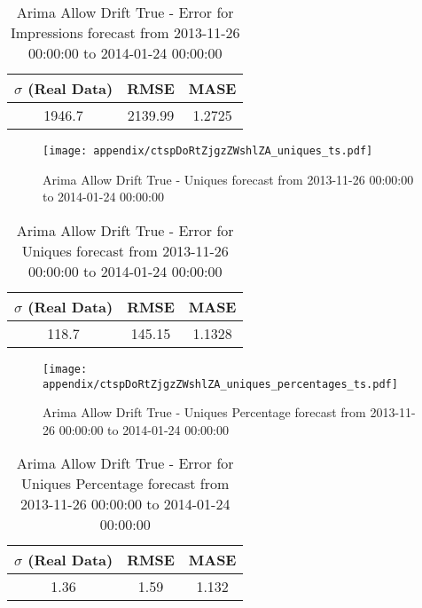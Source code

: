 \begin{table}[H]
\centering
\footnotesize
\begin{tabular}{ccc}
$\sigma$ (Real Data) & RMSE & MASE   \\ \hline
1946.7 & 2139.99 & 1.2725 \\
\end{tabular}

\vspace{0.5cm}

\caption{
Arima Allow Drift True - Error for Impressions forecast from 2013-11-26 00:00:00 to 2014-01-24 00:00:00}
\end{table}

\begin{figure}[H] \begin{center} \leavevmode
\texttt{[image: appendix/ctspDoRtZjgzZWshlZA\_uniques\_ts.pdf]} \caption{
Arima Allow Drift True - Uniques forecast from 2013-11-26 00:00:00 to 2014-01-24 00:00:00} \label{fig:appendix/ctspDoRtZjgzZWshlZA_uniques_ts.pdf} \end{center}
\end{figure}

\begin{table}[H]
\centering
\footnotesize
\begin{tabular}{ccc}
$\sigma$ (Real Data) & RMSE & MASE   \\ \hline
118.7 & 145.15 & 1.1328 \\
\end{tabular}

\vspace{0.5cm}

\caption{
Arima Allow Drift True - Error for Uniques forecast from 2013-11-26 00:00:00 to 2014-01-24 00:00:00}
\end{table}

\begin{figure}[H] \begin{center} \leavevmode
\texttt{[image: appendix/ctspDoRtZjgzZWshlZA\_uniques\_percentages\_ts.pdf]} \caption{
Arima Allow Drift True - Uniques Percentage forecast from 2013-11-26 00:00:00 to 2014-01-24 00:00:00} \label{fig:appendix/ctspDoRtZjgzZWshlZA_uniques_percentages_ts.pdf} \end{center}
\end{figure}

\begin{table}[H]
\centering
\footnotesize
\begin{tabular}{ccc}
$\sigma$ (Real Data) & RMSE & MASE   \\ \hline
1.36 & 1.59 & 1.132 \\
\end{tabular}

\vspace{0.5cm}

\caption{
Arima Allow Drift True - Error for Uniques Percentage forecast from 2013-11-26 00:00:00 to 2014-01-24 00:00:00}
\end{table}


